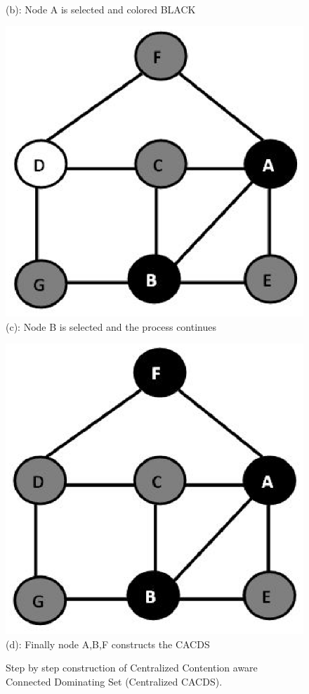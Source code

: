 \begin{figure}[h]
\begin{minipage}{.25\textwidth}
\\(b): Node A is selected and colored BLACK
\end{minipage}%
\begin{minipage}{.25\textwidth}
\centering
\includegraphics[width=0.9\linewidth,height=.8\linewidth]{Figures/cacds3.eps}
\\(c): Node B is selected and the process continues
\end{minipage}%
\begin{minipage}{.25\textwidth}
\centering
\includegraphics[width=0.9\linewidth,height=.8\linewidth]{Figures/cacds4.eps}
\\(d): Finally node A,B,F constructs the CACDS
\end{minipage}
\caption{ Step by step construction of Centralized Contention aware Connected Dominating Set (Centralized CACDS).}
\label{cds}
\end{figure}

